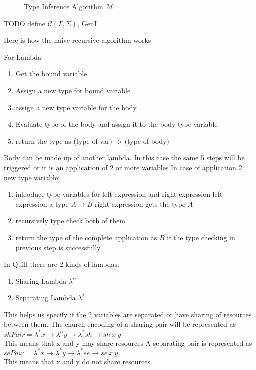\begin{figure}[h]
\begin{framed}
    \begin{minipage}{1\linewidth}
    \end{minipage}

\end{framed}
  \caption{Type Inference Algorithm $\mathcal{M}$}
  \label{fig:algorithm-m}
\end{figure}
TODO define $\mathcal{C}(\Gamma, \Sigma)$, GenI

Here is how the naive recursive algorithm works

For Lambda
\begin{enumerate}
\item Get the bound variable
\item Assign a new type for bound variable
\item assign a new type variable for the body
\item Evaluate type of the body and assign it to the body type variable
\item return the type as (type of var) -> (type of body)
\end{enumerate}

Body can be made up of another lambda. In this case the same 5 steps will be triggered
or it is an application of 2 or more variables
In case of application 2 new type variable:
\begin{enumerate}
\item introduce type variables for left expression and right expression
    left expression a type $A \rightarrow B$ right expression gets the type $A$
\item recursively type check both of them
\item return the type of the complete application as $B$ if the type checking in previous step is successfully
\end{enumerate}


In Quill there are 2 kinds of lambdas:
\begin{enumerate}
\item Sharing Lambda $\lambda^{\alpha}$
\item Separating Lambda $\lambda^{*}$
\end{enumerate}
This helps us specify if the 2 variables are separated or have sharing
of resources between them.
The church encoding of a sharing pair will be represented as\\
$shPair = \lambda^{*} x \rightarrow \lambda^{\alpha} y \rightarrow \lambda^{*} sh \rightarrow sh\ x\ y$\\
This means that x and y may share resources
A separating pair is represented as\\
$sePair = \lambda^{*} x \rightarrow \lambda^{*}y \rightarrow \lambda^{*}se \rightarrow se\ x\ y$\\
This means that x and y do not share resources.

